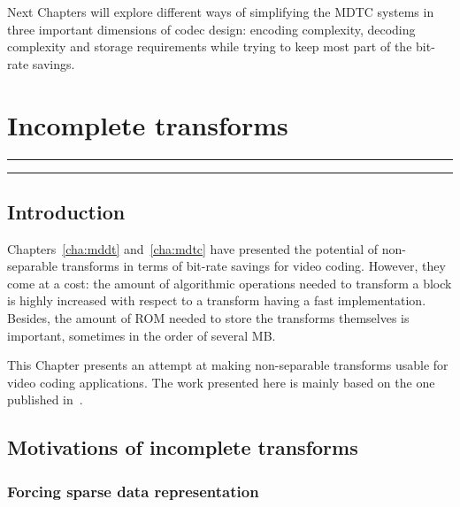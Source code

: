 \documentclass[11pt,a4paper,openright,twoside]{book}
\providecommand{\chaptertoc}{
	\startcontents[chapters]
	\hrule
	\vspace{1em}
	\printcontents[chapters]{}{1}{{\sf\large\bfseries Contents}}
	\vspace{1em}
	\hrule
}
\numberwithin{equation}{section} %
\numberwithin{figure}{section} %
\numberwithin{table}{section} %
\begin{document}
Next Chapters will explore different ways of simplifying the \ac{MDTC} systems
in three important dimensions of codec design:
encoding complexity, decoding complexity and storage
requirements while trying to keep most part of the bit-rate savings.

\chapter{Incomplete transforms}
\label{cha:incomplete_transforms}
\chaptertoc

\section{Introduction}
\label{sec:it_introduction}

Chapters~\ref{cha:mddt} and~\ref{cha:mdtc} have presented the potential of
non-separable transforms in terms of bit-rate savings for video coding.
However, they come at a cost:
the amount of algorithmic operations needed to transform a block is highly
increased with respect to a transform having a fast implementation.
Besides, the amount of \acs{ROM} needed to store the transforms themselves is
important, sometimes in the order of several MB.

This Chapter presents an attempt at making non-separable transforms usable for
video coding applications.
The work presented here is mainly based on the one published
in~\cite{arrufat-15-inc-transforms}.

\section{Motivations of incomplete transforms}
\label{sec:it_motivations}

\subsection{Forcing sparse data representation}
\label{sub:it_forcing_sparse_data_representation}
\end{document}
